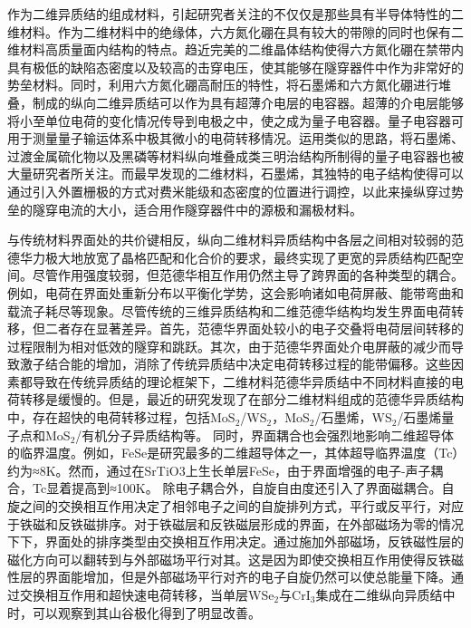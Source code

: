     作为二维异质结的组成材料，引起研究者关注的不仅仅是那些具有半导体特性的二维材料。作为二维材料中的绝缘体，六方氮化硼在具有较大的带隙的同时也保有二维材料高质量面内结构的特点。趋近完美的二维晶体结构使得六方氮化硼在禁带内具有极低的缺陷态密度以及较高的击穿电压，使其能够在隧穿器件中作为非常好的势垒材料。同时，利用六方氮化硼高耐压的特性，将石墨烯和六方氮化硼进行堆叠，制成的纵向二维异质结可以作为具有超薄介电层的电容器。超薄的介电层能够将小至单位电荷的变化情况传导到电极之中，使之成为量子电容器。量子电容器可用于测量量子输运体系中极其微小的电荷转移情况。运用类似的思路，将石墨烯、过渡金属硫化物以及黑磷等材料纵向堆叠成类三明治结构所制得的量子电容器也被大量研究者所关注。而最早发现的二维材料，石墨烯，其独特的电子结构使得可以通过引入外置栅极的方式对费米能级和态密度的位置进行调控，以此来操纵穿过势垒的隧穿电流的大小，适合用作隧穿器件中的源极和漏极材料。

    与传统材料界面处的共价键相反，纵向二维材料异质结构中各层之间相对较弱的范德华力极大地放宽了晶格匹配和化合价的要求，最终实现了更宽的异质结构匹配空间。尽管作用强度较弱，但范德华相互作用仍然主导了跨界面的各种类型的耦合。例如，电荷在界面处重新分布以平衡化学势，这会影响诸如电荷屏蔽、能带弯曲和载流子耗尽等现象。尽管传统的三维异质结构和二维范德华结构均发生界面电荷转移，但二者存在显著差异。首先，范德华界面处较小的电子交叠将电荷层间转移的过程限制为相对低效的隧穿和跳跃。其次，由于范德华界面处介电屏蔽的减少而导致激子结合能的增加，消除了传统异质结中决定电荷转移过程的能带偏移。这些因素都导致在传统异质结的理论框架下，二维材料范德华异质结中不同材料直接的电荷转移是缓慢的。但是，最近的研究发现了在部分二维材料组成的范德华异质结构中，存在超快的电荷转移过程，包括MoS$_2$/WS$_2$，MoS$_2$/石墨烯，WS$_2$/石墨烯量子点和MoS$_2$/有机分子异质结构等。%
    同时，界面耦合也会强烈地影响二维超导体的临界温度。例如，FeSe是研究最多的二维超导体之一，其体超导临界温度（Tc）约为≈8K。然而，通过在SrTiO3上生长单层FeSe，由于界面增强的电子-声子耦合，Tc显着提高到≈100K。%
    除电子耦合外，自旋自由度还引入了界面磁耦合。自旋之间的交换相互作用决定了相邻电子之间的自旋排列方式，平行或反平行，对应于铁磁和反铁磁排序。对于铁磁层和反铁磁层形成的界面，在外部磁场为零的情况下下，界面处的排序类型由交换相互作用决定。通过施加外部磁场，反铁磁性层的磁化方向可以翻转到与外部磁场平行对其。这是因为即使交换相互作用使得反铁磁性层的界面能增加，但是外部磁场平行对齐的电子自旋仍然可以使总能量下降。通过交换相互作用和超快速电荷转移，当单层WSe$_2$与CrI$_3$集成在二维纵向异质结中时，可以观察到其山谷极化得到了明显改善。%


